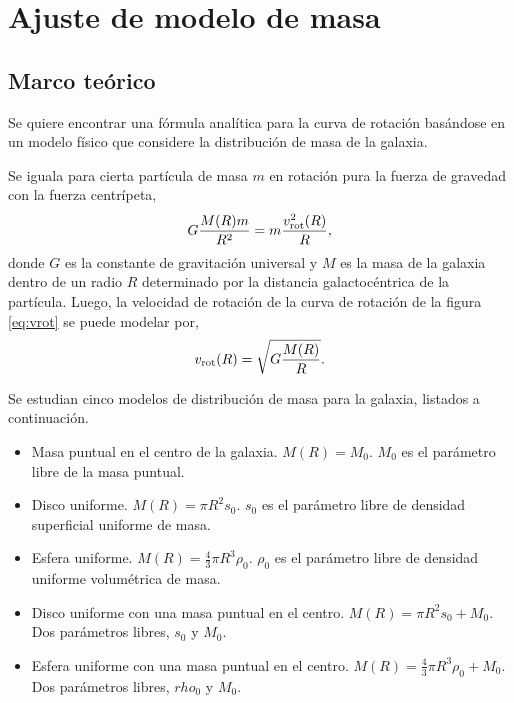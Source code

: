 \section{Ajuste de modelo de masa}

\subsection{Marco teórico}

Se quiere encontrar una fórmula analítica para la curva de rotación basándose en un modelo físico que considere la distribución de masa de la galaxia.

Se iguala para cierta partícula de masa $m$ en rotación pura la fuerza de gravedad con la fuerza centrípeta,
\begin{equation}
G\frac{M(R)m}{R^2}=m\frac{v_\textnormal{rot}^2(R)}{R}
,\end{equation}
donde $G$ es la constante de gravitación universal y $M$ es la masa de la galaxia dentro de un radio $R$ determinado por la distancia galactocéntrica de la partícula. Luego, la velocidad de rotación de la curva de rotación de la figura \ref{eq:vrot} se puede modelar por,
\begin{equation}
v_\textnormal{rot}(R)=\sqrt{G\frac{M(R)}{R}}
.\label{eq:vmass}\end{equation}

Se estudian cinco modelos de distribución de masa para la galaxia, listados a continuación.
\begin{itemize}
\item Masa puntual en el centro de la galaxia. $M(R)=M_0$. $M_0$ es el parámetro libre de la masa puntual.

\item Disco uniforme. $M(R)=\pi R^2s_0$. $s_0$ es el parámetro libre de densidad superficial uniforme de masa.

\item Esfera uniforme. $M(R)=\frac{4}{3}\pi R^3\rho_0$. $\rho_0$ es el parámetro libre de densidad uniforme volumétrica de masa.

\item Disco uniforme con una masa puntual en el centro. $M(R)=\pi R^2s_0+M_0$. Dos parámetros libres, $s_0$ y $M_0$.

\item Esfera uniforme con una masa puntual en el centro. $M(R)=\frac{4}{3}\pi R^3\rho_0+M_0$. Dos parámetros libres, $rho_0$ y $M_0$.
\end{itemize}

